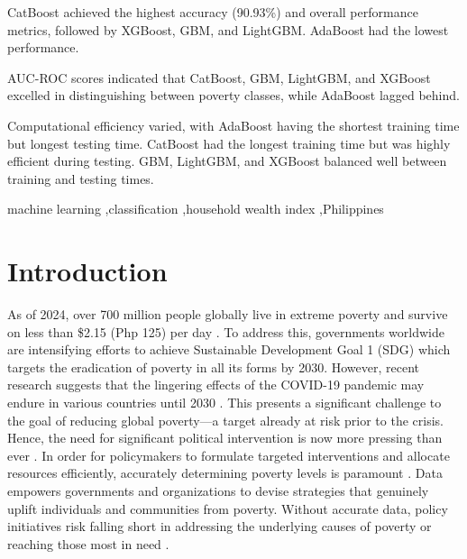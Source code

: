 \documentclass[a4paper,fleqn]{cas-sc}
\begin{document}
\begin{highlights}
\item CatBoost achieved the highest accuracy (90.93\%) and overall performance metrics, followed by XGBoost, GBM, and LightGBM. AdaBoost had the lowest performance.
\item AUC-ROC scores indicated that CatBoost, GBM, LightGBM, and XGBoost excelled in distinguishing between poverty classes, while AdaBoost lagged behind.
\item Computational efficiency varied, with AdaBoost having the shortest training time but longest testing time. CatBoost had the longest training time but was highly efficient during testing. GBM, LightGBM, and XGBoost balanced well between training and testing times.
\end{highlights}

\begin{keywords}
machine learning \sep classification \sep household wealth index \sep Philippines
\end{keywords}


\maketitle

\section{Introduction}

As of 2024, over 700 million people globally live in extreme poverty and survive on less than \$2.15 (Php 125) per day \citep{worldbank2024poverty}. To address this, governments worldwide are intensifying efforts to achieve Sustainable Development Goal 1 (SDG) which targets the eradication of poverty in all its forms by 2030. However, recent research suggests that the lingering effects of the COVID-19 pandemic may endure in various countries until 2030 \citep{shulla2021effects}. This presents a significant challenge to the goal of reducing global poverty—a target already at risk prior to the crisis. Hence, the need for significant political intervention is now more pressing than ever \citep{worldbank2024poverty}. In order for policymakers to formulate targeted interventions and allocate resources efficiently, accurately determining poverty levels is paramount \citep{riegner2016implementing}. Data empowers governments and organizations to devise strategies that genuinely uplift individuals and communities from poverty. Without accurate data, policy initiatives risk falling short in addressing the underlying causes of poverty or reaching those most in need \citep{grindle2004good}.
\end{document}
